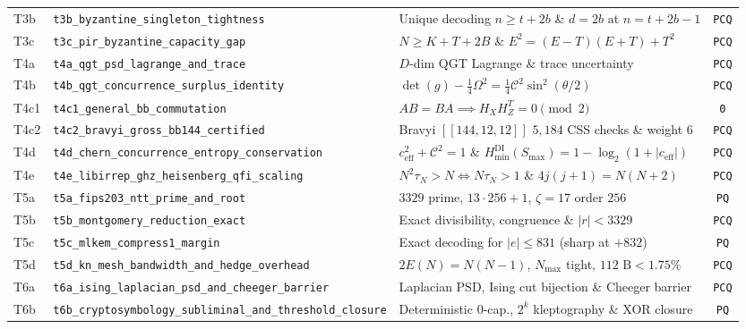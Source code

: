 \documentclass[11pt,reqno]{amsart}
\theoremstyle{definition}
\newcommand{\Hmin}{H_{\min}^{\mathrm{DI}}}
\newcommand{\Con}{\mathcal{C}}
\newcommand{\code}[1]{\texttt{\small #1}}
\begin{document}
\begin{table}[t]
\begin{tabularx}{\linewidth}{@{}l l Y c@{}}
T3b & \code{t3b\_byzantine\_singleton\_tightness} & Unique decoding $n\ge t{+}2b$ \& $d=2b$ at $n=t{+}2b{-}1$ & \code{PCQ} \\
T3c & \code{t3c\_pir\_byzantine\_capacity\_gap} & $N\ge K{+}T{+}2B$ \& $E^2 = (E{-}T)(E{+}T)+T^2$~\cite{banawan2019,mega_atlas_2026} & \code{PCQ} \\
T4a & \code{t4a\_qgt\_psd\_lagrange\_and\_trace} & $D$-dim QGT Lagrange \& trace uncertainty~\cite{provost1980,tsotchke_qgtl} & \code{PCQ} \\
T4b & \code{t4b\_qgt\_concurrence\_surplus\_identity} & $\det(g)-\frac{1}{4}\Omega^2 = \frac{1}{4}\Con^2\sin^2(\theta/2)$~\cite{wootters1998,horodecki1995} & \code{PCQ} \\
T4c1 & \code{t4c1\_general\_bb\_commutation} & $AB=BA \implies H_X H_Z^T = 0 \pmod{2}$~\cite{bravyi2024} & \code{0} \\
T4c2 & \code{t4c2\_bravyi\_gross\_bb144\_certified} & Bravyi $[[144,12,12]]$ $5{,}184$ CSS checks \& weight $6$~\cite{bravyi2024} & \code{PCQ} \\
T4d & \code{t4d\_chern\_concurrence\_entropy\_conservation} & $c_{\mathrm{eff}}^2+\Con^2=1$ \& $\Hmin(S_{\max})=1-\log_2(1+|c_{\mathrm{eff}}|)$ & \code{PCQ} \\
T4e & \code{t4e\_libirrep\_ghz\_heisenberg\_qfi\_scaling} & $N^2\tau_N > N \iff N\tau_N > 1$ \& $4j(j+1)=N(N+2)$~\cite{giovannetti2006,tsotchke_libirrep} & \code{PCQ} \\
T5a & \code{t5a\_fips203\_ntt\_prime\_and\_root} & $3329$ prime, $13\cdot 256+1$, $\zeta=17$ order $256$~\cite{nist_fips203} & \code{PQ} \\
T5b & \code{t5b\_montgomery\_reduction\_exact} & Exact divisibility, congruence \& $|r|<3329$~\cite{nist_fips203,tsotchke_moonlab} & \code{PCQ} \\
T5c & \code{t5c\_mlkem\_compress1\_margin} & Exact decoding for $|e|\le 831$ (sharp at $+832$)~\cite{nist_fips203} & \code{PQ} \\
T5d & \code{t5d\_kn\_mesh\_bandwidth\_and\_hedge\_overhead} & $2E(N)=N(N{-}1)$, $N_{\max}$ tight, $112\text{ B}<1.75\%$~\cite{tsotchke_pqcb} & \code{PCQ} \\
T6a & \code{t6a\_ising\_laplacian\_psd\_and\_cheeger\_barrier} & Laplacian PSD, Ising cut bijection \& Cheeger barrier~\cite{hoory2006,tsotchke_sbnn} & \code{PCQ} \\
T6b & \code{t6b\_cryptosymbology\_subliminal\_and\_threshold\_closure} & Deterministic $0$-cap., $2^k$ kleptography \& XOR closure~\cite{simmons1984,youngyung1996} & \code{PQ} \\

\end{tabularx}
\end{table}
\end{document}
